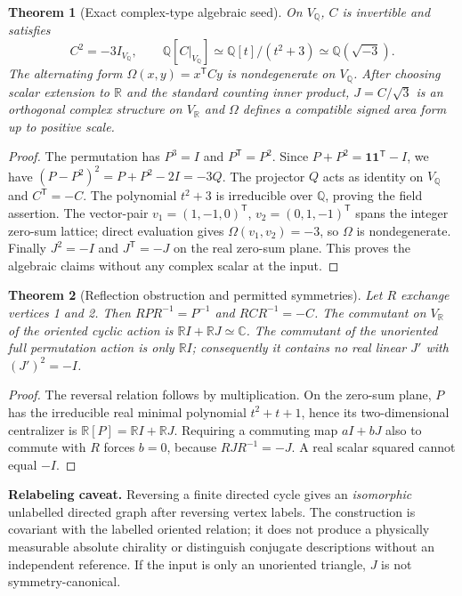 \documentclass[10pt,letterpaper]{article}
\newtheorem{theorem}{Theorem}
\newcommand{\Q}{\mathbb Q}
\newcommand{\R}{\mathbb R}
\newcommand{\C}{\mathbb C}
\begin{document}
\begin{theorem}[Exact complex-type algebraic seed]
On $V_\Q$, $C$ is invertible and satisfies
\begin{equation}
 C^2=-3I_{V_\Q},\qquad
 \Q[C|_{V_\Q}]\simeq\Q[t]/(t^2+3)\simeq\Q(\sqrt{-3}).\label{eq:seed}
\end{equation}
The alternating form $\Omega(x,y)=x^\mathsf{T}Cy$ is nondegenerate on $V_\Q$.  After \emph{choosing} scalar extension to $\R$ and the standard counting inner product, $J=C/\sqrt3$ is an orthogonal complex structure on $V_\R$ and $\Omega$ defines a compatible signed area form up to positive scale.
\end{theorem}
\begin{proof}
The permutation has $P^3=I$ and $P^\mathsf{T}=P^2$.  Since $P+P^2=\mathbf1\mathbf1^\mathsf{T}-I$, we have $(P-P^2)^2=P+P^2-2I=-3Q$.  The projector $Q$ acts as identity on $V_\Q$ and $C^\mathsf{T}=-C$.  The polynomial $t^2+3$ is irreducible over $\Q$, proving the field assertion.  The vector-pair $v_1=(1,-1,0)^\mathsf{T}$, $v_2=(0,1,-1)^\mathsf{T}$ spans the integer zero-sum lattice; direct evaluation gives $\Omega(v_1,v_2)=-3$, so $\Omega$ is nondegenerate.  Finally $J^2=-I$ and $J^\mathsf{T}=-J$ on the real zero-sum plane.  This proves the algebraic claims without any complex scalar at the input.
\end{proof}

\begin{theorem}[Reflection obstruction and permitted symmetries]
Let $R$ exchange vertices 1 and 2.  Then $RPR^{-1}=P^{-1}$ and $RCR^{-1}=-C$.  The commutant on $V_\R$ of the \emph{oriented} cyclic action is $\R I+\R J\simeq\C$.  The commutant of the \emph{unoriented} full permutation action is only $\R I$; consequently it contains no real linear $J'$ with $(J')^2=-I$.
\end{theorem}
\begin{proof}
The reversal relation follows by multiplication.  On the zero-sum plane, $P$ has the irreducible real minimal polynomial $t^2+t+1$, hence its two-dimensional centralizer is $\R[P]=\R I+\R J$.  Requiring a commuting map $aI+bJ$ also to commute with $R$ forces $b=0$, because $RJR^{-1}=-J$.  A real scalar squared cannot equal $-I$.
\end{proof}

\textbf{Relabeling caveat.} Reversing a finite directed cycle gives an \emph{isomorphic} unlabelled directed graph after reversing vertex labels. The construction is covariant with the labelled oriented relation; it does not produce a physically measurable absolute chirality or distinguish conjugate descriptions without an independent reference.  If the input is only an unoriented triangle, $J$ is not symmetry-canonical.
\end{document}
